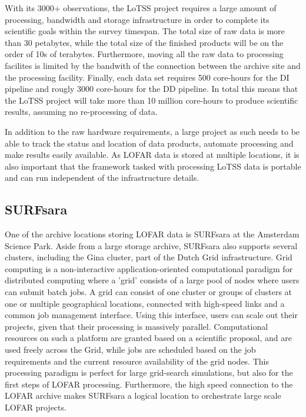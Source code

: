 With its 3000+ observations, the LoTSS project requires a large amount of processing, bandwidth and storage infrastructure in order to complete its scientific goals within the survey timespan. The total size of raw data is more than 30 petabytes, while the total size of the finished products will be on the order of 10s of terabytes. Furthermore, moving all the raw data to processing facilites is limited by the bandwith of the connection between the archive site and the processing facility. Finally, each data set requires 500 core-hours for the DI pipeline and rougly 3000 core-hours for the DD pipeline. In total this means that the LoTSS project will take more than 10 million core-hours to produce scientific results, assuming no re-processing of data. 
 
In addition to the raw hardware requirements, a large project as such needs to be able to track the status and location of data products, automate processing and make results easily available. As LOFAR data is stored at multiple locations, it is also important that the framework tasked with processing LoTSS data is portable and can run independent of the infrastructure details.

\subsection{SURFsara} 

One of the archive locations storing LOFAR data is SURFsara at the Amsterdam Science Park. Aside from a large storage archive, SURFsara also supports several clusters, including the Gina cluster, part of the Dutch Grid infrastructure. Grid computing is a non-interactive application-oriented computational paradigm for distributed computing where a 'grid' consists of a large pool of nodes where users can submit batch jobs. A grid can consist of one cluster or groups of clusters at one or multiple geographical locations, connected with high-speed links and a common job management interface. Using this interface, users can scale out their projects, given that their processing is massively parallel. Computational resources on such a platform are granted based on a scientific proposal, and are used freely across the Grid, while jobs are scheduled based on the job requirements and the current resource availability of the grid nodes. This processing paradigm is perfect for large grid-search simulations, but also for the first steps of LOFAR processing. Furthermore, the high speed connection to the LOFAR archive makes SURFsara a logical location to orchestrate large scale LOFAR projects.


